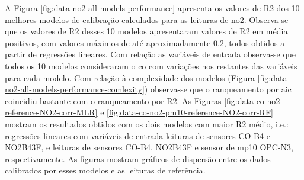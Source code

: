 A Figura \ref{fig:data-no2-all-models-performance} apresenta os valores de R2 dos 10 melhores modelos de calibração calculados para as leituras de \acrshort{no2}. Observa-se que os valores de R2 desses 10 modelos apresentaram valores de R2 em média positivos, com valores máximos de até aproximadamente 0.2, todos obtidos a partir de regressões lineares. Com relação as variáveis de entrada observa-se que todos os 10 modelos consideraram o \acrshort{co} com variações nos restantes das variáveis para cada modelo. Com relação à complexidade dos modelos (Figura \ref{fig:data-no2-all-models-performance-comlexity}) observa-se que o ranqueamento por \acrshort{aic} coincidiu bastante com o ranqueamento por R2. As Figuras \ref{fig:data-co-no2-reference-NO2-corr-MLR} e \ref{fig:data-co-no2-pm10-reference-NO2-corr-RF} mostram os resultados obtidos com os dois modelos com maior R2 médio, i.e.: regressões lineares com variáveis de entrada leituras de sensores CO-B4 e NO2B43F, e leituras de sensores CO-B4, NO2B43F e sensor de \acrshort{mp10} OPC-N3, respectivamente. As figuras mostram gráficos de dispersão entre os dados calibrados por esses modelos e as leituras de referência.

